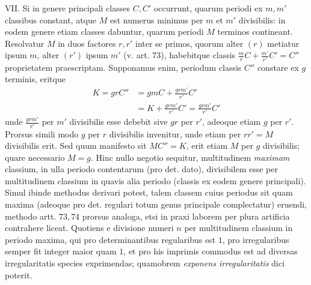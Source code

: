 VII. Si in genere principali classes \(C,C'\) occurrunt, quarum periodi ex \(m,m'\) classibus constant, atque \(M\) est numerus minimus per \(m\) et \(m'\) divisibilis: in eodem genere etiam classes dabuntur, quarum periodi \(M\) terminos contineant. Resolvatur \(M\) in duos factores \(r,r'\) inter se primos, quorum alter \((r)\) metiatur ipsum \(m\), alter \((r')\) ipsum \(m'\) (v. art. \(73\)), habebitque classis \(\frac mrC+\frac{m'}{r'}C'=C''\) proprietatem praescriptam. Supponamus enim, periodum classis \(C''\) constare ex \(g\) terminis, eritque
\[\begin{aligned}K=grC''&=gmC+\frac{grm'}{r'}C'\\&=K+\frac{grm'}{r'}C'=\frac{grm'}{r'}C'\end{aligned}\]
unde \(\frac{grm'}{r'}\) per \(m'\) divisibilis esse debebit sive \(gr\) per \(r'\), adeoque etiam \(g\) per \(r'\). Prorsus simili modo \(g\) per \(r\) divisibilis invenitur, unde etiam per \(rr'=M\) divisibilis erit. Sed quum manifesto sit \(MC''=K\), erit etiam \(M\) per \(g\) divisibilis; quare necessario \(M=g\). Hinc nullo negotio sequitur, multitudinem \textit{maximam} classium, in ulla periodo contentarum (pro det. dato), divisibilem esse per multitudinem classium in quavis alia periodo (classis ex eodem genere principali). Simul ibinde methodus derivari potest, talem classem cuius periodus sit quam maxima (adeoque pro det. regulari totum genus principale complectatur) eruendi, methodo artt. \(73,74\) prorsus analoga, etsi in praxi laborem per plura artificia contrahere liceat. Quotiens e divisione numeri \(n\) per multitudinem classium in periodo maxima, qui pro determinantibus regularibus est \(1\), pro irregularibus semper fit integer maior quam \(1\), et pro his imprimis commodus est ad diversas irregularitatis species exprimendas; quamobrem \textit{exponens irregularitatis} dici poterit.

